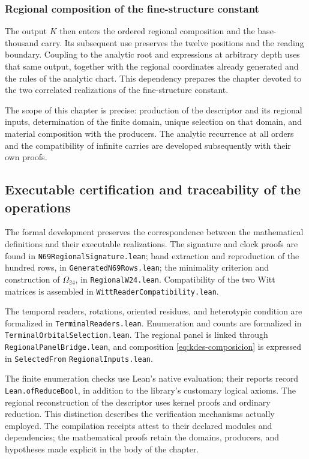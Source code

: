 \subsubsection{Regional composition of the fine-structure constant}

The output $K$ then enters the ordered regional composition and the base-thousand carry. Its subsequent use preserves the twelve positions and the reading boundary. Coupling to the analytic root and expressions at arbitrary depth uses that same output, together with the regional coordinates already generated and the rules of the analytic chart. This dependency prepares the chapter devoted to the two correlated realizations of the fine-structure constant.

The scope of this chapter is precise: production of the descriptor and
its regional inputs, determination of the finite domain,
unique selection on that domain, and material composition with the
producers. The analytic recurrence at all orders and the
compatibility of infinite carries are developed subsequently with their
own proofs.

\subsection{Executable certification and traceability of the operations}

The formal development preserves the correspondence between the
mathematical definitions and their executable realizations. The signature
and clock proofs are found in
\texttt{N69RegionalSignature.lean}; band extraction and
reproduction of the hundred rows, in
\texttt{GeneratedN69Rows.lean}; the minimality criterion and construction
of $\Omega_{24}$, in \texttt{RegionalW24.lean}. Compatibility of
the two Witt matrices is assembled in
\texttt{WittReaderCompatibility.lean}.

The temporal readers, rotations, oriented residues, and
heterotypic condition are formalized in
\texttt{TerminalReaders.lean}. Enumeration and counts are
formalized in \texttt{Terminal}\allowbreak\texttt{Orbital}\allowbreak\texttt{Selection.lean}. The regional
panel is linked through \texttt{Regional}\allowbreak\texttt{Panel}\allowbreak\texttt{Bridge.lean}, and
composition \eqref{eq:kdes-composicion} is expressed in
\texttt{Selected}\allowbreak\texttt{From}\allowbreak%
\texttt{Regional}\allowbreak\texttt{Inputs.lean}.

The finite enumeration checks use Lean's native
evaluation; their reports record \texttt{Lean.ofReduceBool}, in addition
to the library's customary logical axioms. The regional reconstruction
of the descriptor uses kernel proofs and ordinary
reduction. This distinction describes the verification mechanisms
actually employed. The compilation receipts attest to their declared modules
and dependencies; the mathematical proofs retain the
domains, producers, and hypotheses made explicit in the body
of the chapter.
